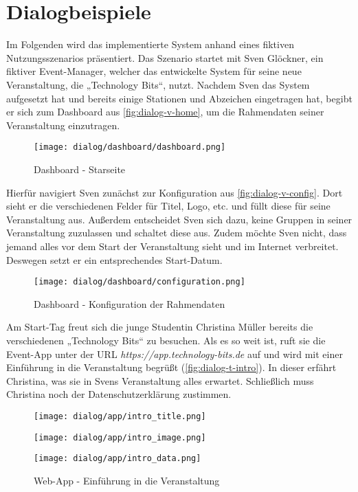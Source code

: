 \chapter{Dialogbeispiele} \label{chapter:dialog}

Im Folgenden wird das implementierte System anhand eines fiktiven
Nutzungsszenarios präsentiert. Das Szenario startet mit Sven Glöckner, ein
fiktiver Event-Manager, welcher das entwickelte System für seine neue
Veranstaltung, die „Technology Bits“, nutzt. Nachdem Sven das System aufgesetzt
hat und bereits einige Stationen und Abzeichen eingetragen hat, begibt er sich
zum Dashboard aus \autoref{fig:dialog-v-home}, um die Rahmendaten seiner
Veranstaltung einzutragen.

\begin{figure}[htpb]
    \centering
    \texttt{[image: dialog/dashboard/dashboard.png]}
    \caption{Dashboard - Starseite}
    \label{fig:dialog-v-home}
\end{figure}

Hierfür navigiert Sven zunächst zur Konfiguration aus
\autoref{fig:dialog-v-config}. Dort sieht er die verschiedenen Felder für Titel,
Logo, etc. und füllt diese für seine Veranstaltung aus. Außerdem entscheidet
Sven sich dazu, keine Gruppen in seiner Veranstaltung zuzulassen und schaltet
diese aus. Zudem möchte Sven nicht, dass jemand alles vor dem Start der
Veranstaltung sieht und im Internet verbreitet. Deswegen setzt er ein
entsprechendes Start-Datum.

\begin{figure}[htpb]
    \centering
    \texttt{[image: dialog/dashboard/configuration.png]}
    \caption{Dashboard - Konfiguration der Rahmendaten}
    \label{fig:dialog-v-config}
\end{figure}

Am Start-Tag freut sich die junge Studentin Christina Müller bereits die
verschiedenen „Technology Bits“ zu besuchen. Als es so weit ist, ruft sie die
Event-App unter der URL \textit{https://app.technology-bits.de} auf und wird mit
einer Einführung in die Veranstaltung begrüßt (\autoref{fig:dialog-t-intro}).
In dieser erfährt Christina, was sie in Svens Veranstaltung alles erwartet.
Schließlich muss Christina noch der Datenschutzerklärung zustimmen.

\begin{figure}[htpb]
    \centering
    \begin{minipage}{.325\textwidth}
        \centering
        \texttt{[image: dialog/app/intro\_title.png]}
    \end{minipage}%
    \begin{minipage}{.325\textwidth}
        \centering
        \texttt{[image: dialog/app/intro\_image.png]}
    \end{minipage}
    \begin{minipage}{.325\textwidth}
        \centering
        \texttt{[image: dialog/app/intro\_data.png]}
    \end{minipage}
    \caption{Web-App - Einführung in die Veranstaltung}
    \label{fig:dialog-t-intro}
\end{figure}

